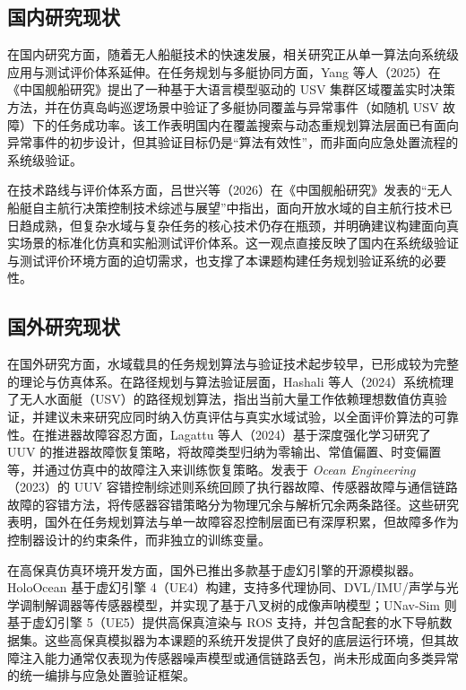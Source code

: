 \subsection{国内研究现状}

在国内研究方面，随着无人船艇技术的快速发展，相关研究正从单一算法向系统级应用与测试评价体系延伸。在任务规划与多艇协同方面，Yang 等人（2025）在《中国舰船研究》提出了一种基于大语言模型驱动的 USV 集群区域覆盖实时决策方法，并在仿真岛屿巡逻场景中验证了多艇协同覆盖与异常事件（如随机 USV 故障）下的任务成功率\cite{yang2025}。该工作表明国内在覆盖搜索与动态重规划算法层面已有面向异常事件的初步设计，但其验证目标仍是“算法有效性”，而非面向应急处置流程的系统级验证。

在技术路线与评价体系方面，吕世兴等（2026）在《中国舰船研究》发表的“无人船艇自主航行决策控制技术综述与展望”中指出，面向开放水域的自主航行技术已日趋成熟，但复杂水域与复杂任务的核心技术仍存在瓶颈，并明确建议构建面向真实场景的标准化仿真和实船测试评价体系\cite{lv2026}。这一观点直接反映了国内在系统级验证与测试评价环境方面的迫切需求，也支撑了本课题构建任务规划验证系统的必要性。

\subsection{国外研究现状}

在国外研究方面，水域载具的任务规划算法与验证技术起步较早，已形成较为完整的理论与仿真体系。在路径规划与算法验证层面，Hashali 等人（2024）系统梳理了无人水面艇（USV）的路径规划算法，指出当前大量工作依赖理想数值仿真验证，并建议未来研究应同时纳入仿真评估与真实水域试验，以全面评价算法的可靠性\cite{hashali2024}。在推进器故障容忍方面，Lagattu 等人（2024）基于深度强化学习研究了 UUV 的推进器故障恢复策略，将故障类型归纳为零输出、常值偏置、时变偏置等，并通过仿真中的故障注入来训练恢复策略\cite{lagattu2024drl}。发表于 \textit{Ocean Engineering}（2023）的 UUV 容错控制综述则系统回顾了执行器故障、传感器故障与通信链路故障的容错方法，将传感器容错策略分为物理冗余与解析冗余两条路径\cite{ftc2023}。这些研究表明，国外在任务规划算法与单一故障容忍控制层面已有深厚积累，但故障多作为控制器设计的约束条件，而非独立的训练变量。

在高保真仿真环境开发方面，国外已推出多款基于虚幻引擎的开源模拟器。HoloOcean 基于虚幻引擎 4（UE4）构建，支持多代理协同、DVL/IMU/声学与光学调制解调器等传感器模型，并实现了基于八叉树的成像声呐模型\cite{holocean}；UNav-Sim 则基于虚幻引擎 5（UE5）提供高保真渲染与 ROS 支持，并包含配套的水下导航数据集\cite{amer2023unav, alvarez2023mimir}。这些高保真模拟器为本课题的系统开发提供了良好的底层运行环境，但其故障注入能力通常仅表现为传感器噪声模型或通信链路丢包，尚未形成面向多类异常的统一编排与应急处置验证框架。

